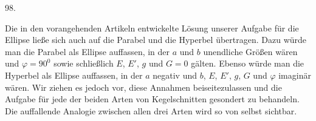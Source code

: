 \par{}\medskip
{}
\begin{center}98.\end{center}
Die in den vorangehenden Artikeln entwickelte Lösung unserer Aufgabe für die Ellipse ließe sich auch auf die Parabel und die Hyperbel übertragen. Dazu würde man die Parabel als Ellipse auffassen, in der $a$ und $b$ unendliche Größen wären und $\varphi=90^0$ sowie schließlich $E$, $E'$, $g$ und $G=0$ gälten. Ebenso würde man die Hyperbel als Ellipse auffassen, in der $a$ negativ und $b$, $E$, $E'$, $g$, $G$ und $\varphi$ imaginär wären. Wir ziehen es jedoch vor, diese Annahmen beiseitezulassen und die Aufgabe für jede der beiden Arten von Kegelschnitten gesondert zu behandeln. Die auffallende Analogie zwischen allen drei Arten wird so von selbst sichtbar.

